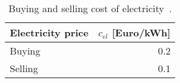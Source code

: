 \begin{table}[htp]
	\centering
	\caption{Buying and selling cost of electricity~\cite{StrompreisWebseiteElComVergleichen}.}
	\label{tab:ec}
	\begin{tabular}{lr} \toprule
		\textbf{Electricity price} & $c_{el}$ [Euro/kWh] \\ \midrule
		Buying          & 0.2       \\
		Selling			& 0.1	\\ \bottomrule     
	\end{tabular}
\end{table}
